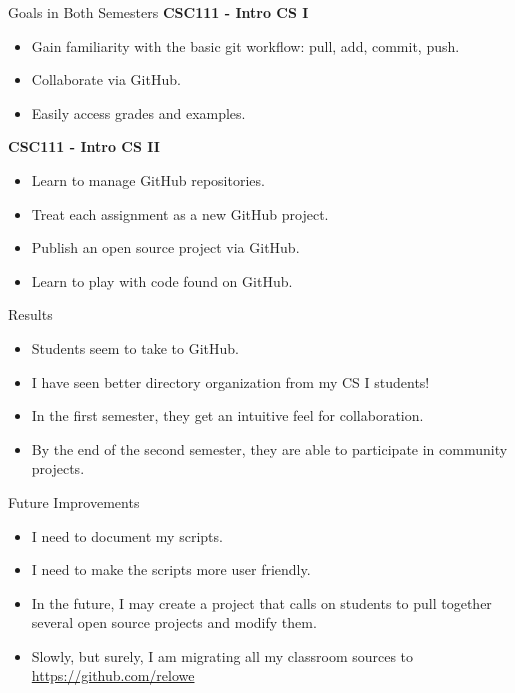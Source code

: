 \documentclass[handout]{beamer}
\begin{document}
\begin{frame}{Goals in Both Semesters}
    \textbf{CSC111 - Intro CS I}
    \begin{itemize}
        \item Gain familiarity with the basic git workflow: pull, add,
            commit, push.
        \item Collaborate via GitHub.
        \item Easily access grades and examples.
    \end{itemize}

    \vspace{1cm}
    \textbf{CSC111 - Intro CS II}
    \begin{itemize}
        \item Learn to manage GitHub repositories.
        \item Treat each assignment as a new GitHub project.
        \item Publish an open source project via GitHub.
        \item Learn to play with code found on GitHub.
    \end{itemize}
\end{frame}

\begin{frame}{Results}
    \begin{itemize}
        \item Students seem to take to GitHub.
        \item I have seen better directory organization from my CS
            I students!
        \item In the first semester, they get an intuitive feel for
            collaboration.
        \item By the end of the second semester, they are able to
            participate in community projects.
    \end{itemize}
\end{frame}

\begin{frame}{Future Improvements}
\begin{itemize}
    \item I need to document my scripts.
    \item I need to make the scripts more user friendly.
    \item In the future, I may create a project that calls on students
        to pull together several open source projects and modify them.
    \item Slowly, but surely, I am migrating all my classroom sources
        to \url{https://github.com/relowe}
\end{itemize}
\end{frame}
\end{document}
